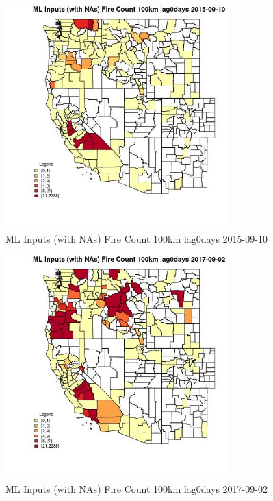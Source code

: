 \begin{figure} 
\centering  
\includegraphics[width=0.77\textwidth]{Code_Outputs/Report_ML_input_PM25_Step4_part_e_de_duplicated_aves_compiled_2019-05-21wNAs_CountyFire_Count_100km_lag0daysMean2015-09-10.jpg} 
\caption{\label{fig:Report_ML_input_PM25_Step4_part_e_de_duplicated_aves_compiled_2019-05-21wNAsCountyFire_Count_100km_lag0daysMean2015-09-10}ML Inputs (with NAs) Fire Count 100km lag0days 2015-09-10} 
\end{figure} 
 

\begin{figure} 
\centering  
\includegraphics[width=0.77\textwidth]{Code_Outputs/Report_ML_input_PM25_Step4_part_e_de_duplicated_aves_compiled_2019-05-21wNAs_CountyFire_Count_100km_lag0daysMean2017-09-02.jpg} 
\caption{\label{fig:Report_ML_input_PM25_Step4_part_e_de_duplicated_aves_compiled_2019-05-21wNAsCountyFire_Count_100km_lag0daysMean2017-09-02}ML Inputs (with NAs) Fire Count 100km lag0days 2017-09-02} 
\end{figure} 
 

